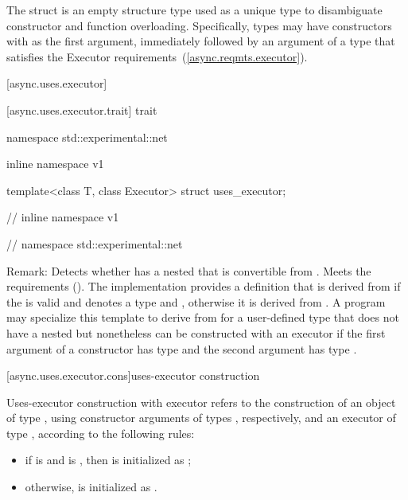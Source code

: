 \pnum
The  struct is an empty structure type used as a unique type to disambiguate constructor and function overloading. Specifically, types may have constructors with  as the first argument, immediately followed by an argument of a type that satisfies the Executor requirements~(\ref{async.reqmts.executor}).



[async.uses.executor]{}


[async.uses.executor.trait]{ trait}

%
\begin{codeblock}
namespace std::experimental::net {
inline namespace v1 {

  template<class T, class Executor> struct uses_executor;

} // inline namespace v1
} // namespace std::experimental::net
\end{codeblock}

\pnum
Remark: Detects whether  has a nested  that is convertible from . Meets the  requirements (). The implementation provides a definition that is derived from  if the   is valid and denotes a type and , otherwise it is derived from . A program may specialize this template to derive from  for a user-defined type  that does not have a nested  but nonetheless can be constructed with an executor if the first argument of a constructor has type  and the second argument has type .



[async.uses.executor.cons]{uses-executor construction}

%
\pnum
Uses-executor construction with executor  refers to the construction of an object  of type , using constructor arguments  of types , respectively, and an executor  of type , according to the following rules:

\begin{itemize}
\item
if  is 
and  is ,
then  is initialized as ;

\item
otherwise,  is initialized as .
\end{itemize}




